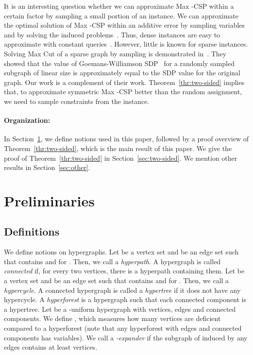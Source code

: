 \documentclass[letterpaper,11pt]{article}
\newcommand{\maxcut}{\textsf{Max Cut}\xspace}
\newcommand{\maxkcsp}{\textsf{Max -CSP}\xspace}
\begin{document}
It is an interesting question whether we can approximate \maxkcsp within a certain factor by sampling a small portion of an instance.
We can approximate the optimal solution of \maxkcsp within an additive error  by sampling  variables and by solving the induced problems~\cite{AdlVKK03}.
Thus, dense instances are easy to approximate with constant queries~\cite{AdlVKK03,AS02,AE02}.
However, little is known for sparse instances.
Solving \maxcut of a sparse graph by sampling is demonstrated in~\cite{BHHS09}.
They showed that the value of Goemans-Williamson SDP~\cite{GW95} for a randomly sampled subgraph of linear size is approximately equal to the SDP value for the original graph.
Our work is a complement of their work.
Theorem~\ref{thr:two-sided} implies that, 
to approximate symmetric \maxkcsp better than the random assignment,
we need to sample  constraints from the instance.

\paragraph{Organization:}
In Section~\ref{sec:preliminary}, 
we define notions used in this paper,
followed by a proof overview of Theorem~\ref{thr:two-sided}, 
which is the main result of this paper.
We give the proof of Theorem~\ref{thr:two-sided} in Section~\ref{sec:two-sided}.
We mention other results in Section~\ref{sec:other}.

\section{Preliminaries}\label{sec:preliminary}
\subsection{Definitions}
We define notions on hypergraphs.
Let  be a vertex set and  be an edge set such that  contains  and  for .
Then, we call  a \textit{hyperpath}.
A hypergraph is called \textit{connected} if, for every two vertices, there is a hyperpath containing them.
Let  be a vertex set and  be an edge set such that  contains  and  for .
Then, we call  a \textit{hypercycle}.
A connected hypergraph is called a \textit{hypertree} if it does not have any hypercycle.
A \textit{hyperforest} is a hypergraph such that each connected component is a hypertree.
Let  be a -uniform hypergraph with  vertices,  edges and  connected components.
We define , which measures how many vertices are deficient compared to a hyperforest (note that any hyperforest with  edges and  connected components has  variables).
We call  a \textit{-expander} if the subgraph of  induced by any  edges contains at least  vertices.
\end{document}
